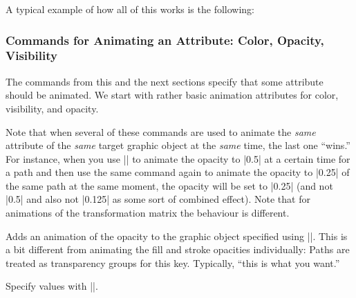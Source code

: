 A typical example of how all of this works is the following:
\begin{codeexample}
{
  \pgfsys@animation@whom{\someid}{}%
  \pgfsys@animatefillopacity%
}
{
  \pgfsys@animation@whom{\someid}{}%
  \pgfsys@animatelinewidth%
}
\end{codeexample}



\subsubsection{Commands for Animating an Attribute: Color, Opacity, Visibility}

The commands from this and the next sections specify that some
attribute should be animated. We start with rather basic animation
attributes for color, visibility, and opacity.

Note that when several of these commands are used to animate the
\emph{same} attribute of the \emph{same} target graphic object at the
\emph{same} time, the last one ``wins.'' For instance, when you use
|\pgfsys@animateopacity| to animate the opacity to |0.5| at a certain
time for a path and then use the same command again to animate the
opacity to |0.25| of the same path at the same moment, the opacity
will be set to |0.25| (and not |0.5| and also not |0.125| as some sort
of combined effect). Note that for animations of the transformation
matrix the behaviour is different. 

\begin{command}{\pgfsys@animateopacity}
  Adds an animation of the opacity to the graphic object specified
  using |\pgfsys@animation@whom|. This is a bit different from animating
  the fill and stroke opacities  individually: Paths are treated as
  transparency groups for this key. Typically, ``this is what you
  want.''
  
  Specify values with |\pgfsys@animation@scalar|.

\begin{codeexample}[width=2cm]
\end{codeexample}
\end{command}

